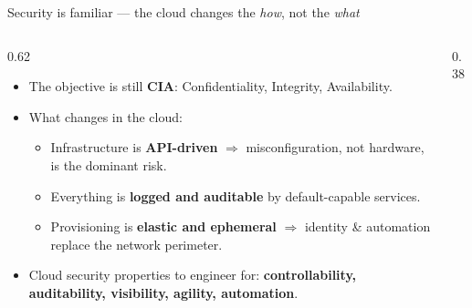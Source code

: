 \documentclass[aspectratio=169,10pt]{beamer}
\newcommand{\term}[1]{{\color{awsink}\textbf{#1}}}
\begin{document}
\begin{frame}{Security is familiar --- the cloud changes the \emph{how}, not the \emph{what}}
  \begin{columns}[T]
    \begin{column}{0.62\textwidth}
      \begin{itemize}
        \item The objective is still \term{CIA}: Confidentiality, Integrity, Availability.
        \item What changes in the cloud:
        \begin{itemize}
          \item Infrastructure is \term{API-driven} $\Rightarrow$ misconfiguration, not
                hardware, is the dominant risk.
          \item Everything is \term{logged and auditable} by default-capable services.
          \item Provisioning is \term{elastic and ephemeral} $\Rightarrow$ identity \&
                automation replace the network perimeter.
        \end{itemize}
        \item Cloud security properties to engineer for:
              \term{controllability, auditability, visibility, agility, automation}.
      \end{itemize}
    \end{column}
    \begin{column}{0.38\textwidth}
      \centering
    \end{column}
  \end{columns}
\end{frame}
\end{document}
